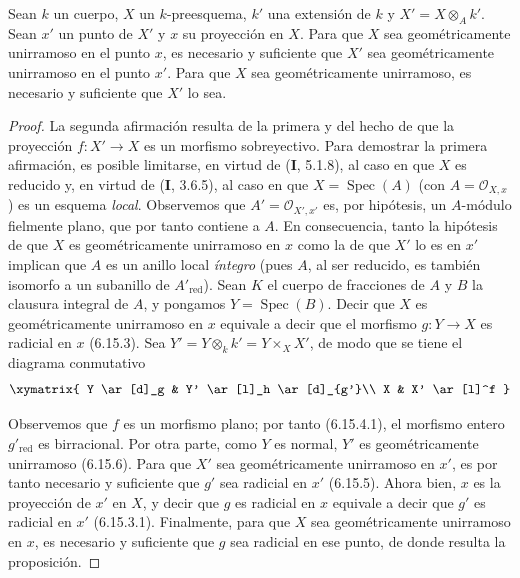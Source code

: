 \begin{proposition}[6.15.7]
Sean $k$ un cuerpo, $X$ un $k$-preesquema, $k'$ una extensión
de $k$ y $X'=X\otimes_A k'$. Sean $x'$ un punto de $X'$ y $x$
su proyección en $X$. Para que $X$ sea geométricamente
unirramoso en el punto $x$, es necesario y suficiente que
$X'$ sea geométricamente unirramoso en el punto $x'$. Para
que $X$ sea geométricamente unirramoso, es necesario y
suficiente que $X'$ lo sea.
\end{proposition}

\begin{proof}
La segunda afirmación resulta de la primera y del hecho de
que la proyección $f:X'\to X$ es un morfismo sobreyectivo.
Para demostrar la primera afirmación, es posible limitarse, en
virtud de (\textbf I, 5.1.8), al caso en que $X$ es reducido y, en
virtud de (\textbf I, 3.6.5), al caso
en que $X=\operatorname{Spec}(A)$ (con $A=\mathcal O_{X,x}$) es un
esquema \emph{local}. Observemos que $A'=\mathcal O_{X',x'}$ es, por
hipótesis, un $A$-módulo fielmente plano, que por tanto
contiene a $A$. En consecuencia, tanto la hipótesis de que
$X$ es geométricamente unirramoso en $x$ como la de que $X'$
lo es en $x'$ implican que $A$ es un anillo local \emph{íntegro}
(pues $A$, al ser reducido, es también isomorfo a un
subanillo de $A'_{\mathrm{red}}$). Sean $K$ el cuerpo de
fracciones de $A$ y $B$ la clausura integral de $A$, y
pongamos $Y=\operatorname{Spec}(B)$. Decir que $X$ es
geométricamente unirramoso en $x$ equivale a decir que el
morfismo $g:Y\to X$ es radicial en $x$ (6.15.3). Sea
$Y'=Y\otimes_k k'=Y\times_X X'$, de modo que se tiene el
diagrama conmutativo
\[
\xymatrix{
Y \ar[d]_g & Y' \ar[l]_h \ar[d]_{g'}\\
X & X' \ar[l]^f
}
\]

Observemos que $f$ es un morfismo plano; por tanto (6.15.4.1),
el morfismo entero $g'_{\mathrm{red}}$ es birracional. Por
otra parte, como $Y$ es normal, $Y'$ es geométricamente
unirramoso (6.15.6). Para que $X'$ sea geométricamente
unirramoso en $x'$, es por tanto necesario y suficiente que
$g'$ sea radicial en $x'$ (6.15.5). Ahora bien, $x$ es la
proyección de $x'$ en $X$, y decir que $g$ es radicial en $x$
equivale a decir que $g'$ es radicial en $x'$ (6.15.3.1).
Finalmente, para que $X$ sea geométricamente unirramoso en
$x$, es necesario y suficiente que $g$ sea radicial en ese
punto, de donde resulta la proposición.
\end{proof}

